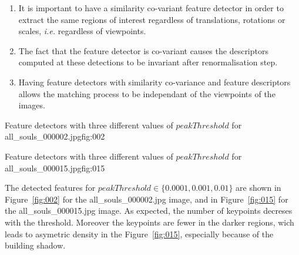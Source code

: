 \documentclass{article}
\begin{document}
\maketitle


\begin{enumerate}
	\item It is important to have a similarity co-variant feature detector in order to extract the same regions of interest regardless of translations, rotations or scales, \textit{i.e.} regardless of viewpoints.
	\item The fact that the feature detector is co-variant causes the descriptors computed at these detections to be invariant after renormalisation step.
	\item Having feature detectors with similarity co-variance and feature descriptors allows the matching process to be independant of the viewpoints of the images.
\end{enumerate}


{}
{}
{Feature detectors with three different values of \(peakThreshold\) for all\_souls\_000002.jpg}{fig:002}

{}
{}
{Feature detectors with three different values of \(peakThreshold\) for all\_souls\_000015.jpg}{fig:015}

The detected features for \(peakThreshold \in \{0.0001, 0.001, 0.01\}\) are shown in Figure~\ref{fig:002} for the all\_souls\_000002.jpg image, and in Figure~\ref{fig:015} for the all\_souls\_000015.jpg image. As expected, the number of keypoints decreses with the threshold. Moreover the keypoints are fewer in the darker regions, wich leads to asymetric density in the Figure~\ref{fig:015}, especially because of the building shadow.
\end{document}
